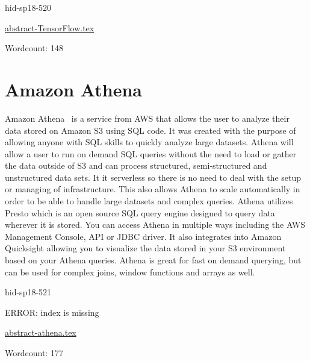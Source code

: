 \begin{IU}

hid-sp18-520

\href{https://github.com/cloudmesh-community/hid-sp18-520/blob/master//technology/abstract-TensorFlow.tex}{abstract-TensorFlow.tex}

 

Wordcount: 148

\end{IU}

\section{Amazon Athena}
Amazon Athena~\cite{hid-sp18-521-athena-faq} is a service from AWS that
allows the user to analyze their data stored on Amazon S3 using SQL code. 
It was created with the purpose of allowing anyone with SQL skills 
to quickly analyze large datasets. Athena will allow a user to run 
on demand SQL queries without the need to load or gather the data 
outside of S3 and can process structured, semi-structured and 
unstructured data sets. It it serverless so there is no need to 
deal with the setup or managing of infrastructure. This also allows
Athena to scale automatically in order to be able to handle large datasets
and complex queries. Athena utilizes Presto which is an open source SQL query
engine designed to query data wherever it is stored. You can access
Athena in multiple ways including the AWS Management Console, API or
JDBC driver. It also integrates into Amazon Quicksight allowing you
to visualize the data stored in your S3 environment based on your
Athena queries. Athena is great for fast on demand querying, but can
be used for complex joins, window functions and arrays as well.


\begin{IU}

hid-sp18-521

ERROR: index is missing

\href{https://github.com/cloudmesh-community/hid-sp18-521/blob/master//technology/abstract-athena.tex}{abstract-athena.tex}

 

Wordcount: 177

\end{IU}

